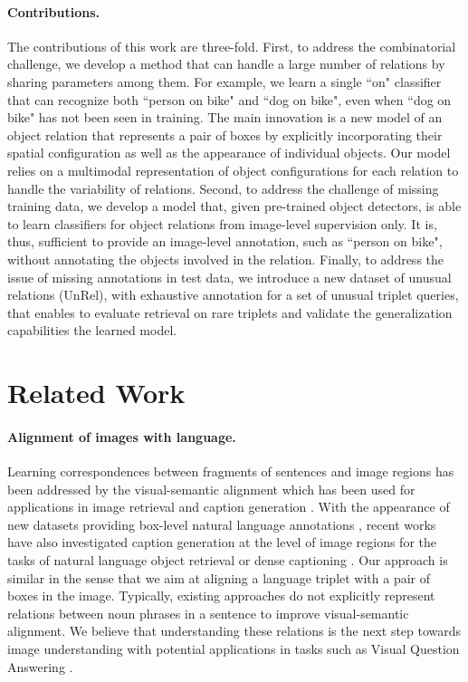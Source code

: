 \documentclass[10pt,twocolumn,letterpaper]{article}
\begin{document}
\paragraph{Contributions.}
The contributions of this work are three-fold. First, to address the combinatorial challenge, we develop a method that can handle a large number of relations by sharing parameters among them. 
For example, we learn  a single ``on" classifier that can recognize
both ``person on bike" and ``dog on bike", even when ``dog on bike" has not been seen in training.  The main innovation is a
new model of an object relation that represents a pair of boxes by
explicitly incorporating their spatial configuration as well as the
appearance of individual objects. 
Our model relies on a multimodal representation of object configurations for each relation to handle the variability of relations. Second, to
address the challenge of missing training data, we develop a model that, given
pre-trained object detectors, is able to learn classifiers for object
relations from image-level supervision only. It is, thus, sufficient 
to provide an image-level annotation, such as  ``person on bike", without
annotating the objects involved in the relation. 
Finally, to address the issue of missing annotations in test data, we introduce a new
dataset of unusual relations (UnRel), with exhaustive annotation for a
set of unusual triplet queries, that enables to evaluate retrieval on
rare triplets and validate the generalization capabilities the learned
model.  

\section{Related Work}

\paragraph{Alignment of images with language.}
Learning correspondences between fragments of sentences and image regions has been addressed by the visual-semantic alignment which has been used for applications in image retrieval and caption generation \cite{chang2015text,Karpathy2014,Karpathy2014a}. With the appearance of new datasets providing box-level natural language annotations \cite{Kazemzadeh2014,Krishna2016,Mao2016,Plummer2015}, recent works have also investigated caption generation at the level of image regions for the tasks of natural language object retrieval \cite{Hu2015,Mao2016,Rohrbach2015} or dense captioning \cite{Johnson2015}. Our approach is similar in the sense that we aim at aligning a language triplet with a pair of boxes in the image. Typically, existing approaches do not explicitly represent relations between noun phrases in a sentence to improve visual-semantic alignment. We believe that understanding these relations is the next step towards image understanding with potential applications in tasks such as Visual Question Answering \cite{Andreas2016}.
\end{document}
